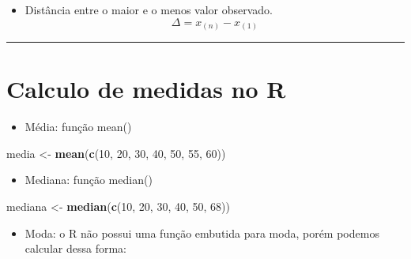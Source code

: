 \documentclass[
]{book}
\newenvironment{Shaded}{\begin{snugshade}}{\end{snugshade}}
\newcommand{\DecValTok}[1]{\textcolor[rgb]{0.00,0.00,0.81}{#1}}
\newcommand{\FunctionTok}[1]{\textcolor[rgb]{0.13,0.29,0.53}{\textbf{#1}}}
\newcommand{\NormalTok}[1]{#1}
\newcommand{\OtherTok}[1]{\textcolor[rgb]{0.56,0.35,0.01}{#1}}
\providecommand{\tightlist}{%
  \setlength{\itemsep}{0pt}\setlength{\parskip}{0pt}}
\begin{document}
\begin{itemize}
\tightlist
\item
  Distância entre o maior e o menos valor observado.
  \[\Delta = x_{(n)} - x_{(1)}\]
\end{itemize}

\begin{center}\rule{0.5\linewidth}{0.5pt}\end{center}

\section{Calculo de medidas no R}\label{calculo-de-medidas-no-r}

\begin{itemize}
\tightlist
\item
  Média: função mean()
\end{itemize}

\begin{Shaded}
\begin{Highlighting}[]
\NormalTok{media }\OtherTok{\textless{}{-}} \FunctionTok{mean}\NormalTok{(}\FunctionTok{c}\NormalTok{(}\DecValTok{10}\NormalTok{, }\DecValTok{20}\NormalTok{, }\DecValTok{30}\NormalTok{, }\DecValTok{40}\NormalTok{, }\DecValTok{50}\NormalTok{, }\DecValTok{55}\NormalTok{, }\DecValTok{60}\NormalTok{))}
\end{Highlighting}
\end{Shaded}

\begin{itemize}
\tightlist
\item
  Mediana: função median()
\end{itemize}

\begin{Shaded}
\begin{Highlighting}[]
\NormalTok{mediana }\OtherTok{\textless{}{-}} \FunctionTok{median}\NormalTok{(}\FunctionTok{c}\NormalTok{(}\DecValTok{10}\NormalTok{, }\DecValTok{20}\NormalTok{, }\DecValTok{30}\NormalTok{, }\DecValTok{40}\NormalTok{, }\DecValTok{50}\NormalTok{, }\DecValTok{68}\NormalTok{))}
\end{Highlighting}
\end{Shaded}

\begin{itemize}
\tightlist
\item
  Moda: o R não possui uma função embutida para moda, porém podemos calcular dessa forma:
\end{itemize}
\end{document}
